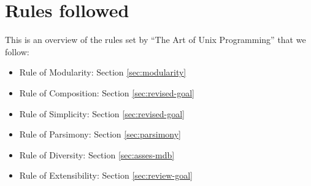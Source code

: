 \documentclass[thesis.tex]{subfiles}
\begin{document}
\chapter{Rules followed}
This is an overview of the rules set by ``The Art of Unix Programming''
that we follow:
\begin{citequote}{\cite[Chapter 1]{UXART}}
\begin{itemize}
	\item Rule of Modularity: Section \ref{sec:modularity}
	\item Rule of Composition: Section \ref{sec:revised-goal}
	\item Rule of Simplicity: Section \ref{sec:revised-goal}
	\item Rule of Parsimony: Section \ref{sec:parsimony}
	\item Rule of Diversity: Section \ref{sec:asses-mdb}
	\item Rule of Extensibility: Section \ref{sec:review-goal}
\end{itemize}
\end{citequote}
\end{document}

